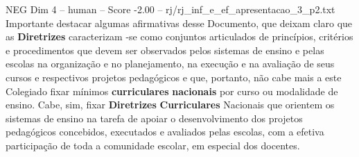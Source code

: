 \begin{textsample}{NEG Dim 4 – human – Score -2.00 – rj/rj\_inf\_e\_ef\_apresentacao\_3\_p2.txt}  \label{ex:f4_neg_004}
Importante destacar algumas afirmativas desse Documento, que deixam claro que as \textbf{Diretrizes} caracterizam -se como conjuntos articulados de princípios, critérios e procedimentos que devem ser observados pelos sistemas de ensino e pelas escolas na organização e no planejamento, na execução e na avaliação de seus cursos e respectivos projetos pedagógicos e que, portanto, não cabe mais a este Colegiado fixar mínimos \textbf{curriculares} \textbf{nacionais} por curso ou modalidade de ensino.
Cabe, sim, fixar \textbf{Diretrizes} \textbf{Curriculares} Nacionais que orientem os sistemas de ensino na tarefa de apoiar o desenvolvimento dos projetos pedagógicos concebidos, executados e avaliados pelas escolas, com a efetiva participação de toda a comunidade escolar, em especial dos docentes.

\end{textsample}

